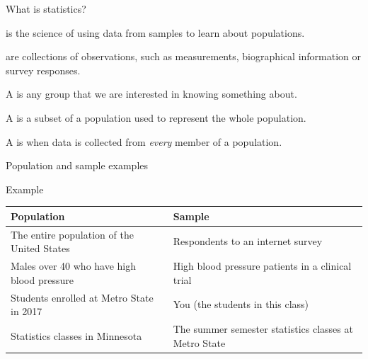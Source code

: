 \documentclass[xcolor=table, aspectratio=169, bigger]{beamer}
\begin{document}
\begin{frame}{What is statistics?}

\begin{block}{}
 is the science of using data from samples to learn about populations.
\end{block}

\pause
\begin{block}{}
 are collections of observations, such as measurements, biographical information or survey responses.
\end{block}

\pause
\begin{block}{}
A  is any group that we are interested in knowing something about.
\end{block}

\pause
\begin{block}{}
A  is a subset of a population used to represent the whole population.
\end{block}

\pause
\begin{block}{}
A  is when data is collected from \emph{every} member of a population.
\end{block}


\end{frame}


\begin{frame}{Population and sample examples}

\begin{exampleblock}{Example}
\begin{center}
\tabspacemed
\begin{tabular}{p{2.5in} | p{2.5in} }
Population & Sample\\
\hline
The entire population of the United States & Respondents to an internet survey\pause\\
Males over 40 who have high blood pressure & High blood pressure patients in a clinical trial\pause\\

Students enrolled at Metro State in 2017 & You (the students in this class)\pause\\
Statistics classes in Minnesota & The summer semester statistics classes at Metro State\\
\end{tabular}
\end{center}
\end{exampleblock}

\end{frame}
\end{document}

